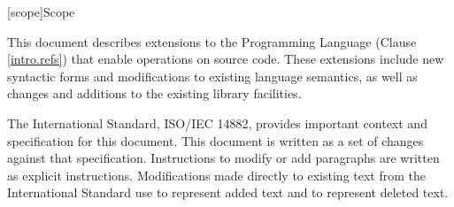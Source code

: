 
[scope]{Scope}

\pnum
This document describes extensions to the \Cpp Programming
Language (Clause \ref{intro.refs}) that enable operations on source code. These
extensions include new syntactic forms and modifications to existing language
semantics, as well as changes and additions to the existing library facilities.

\pnum
The International Standard, ISO/IEC 14882, provides important context and
specification for this document.  This document is written as a
set of changes against that specification.  Instructions to modify or add
paragraphs are written as explicit instructions.  Modifications made directly to
existing text from the International Standard use  to
represent added text and  to represent deleted text.
